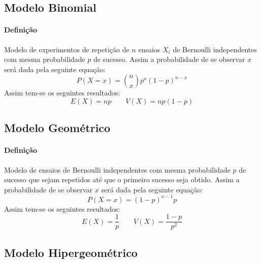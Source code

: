 \documentclass{article}
\begin{document}
        \subsection{Modelo Binomial}
            \paragraph{Definição}Modelo de experimentos de repetição de $n$ ensaios $X_{i}$ de Bernoulli independentes com mesma probabilidade $p$ de sucesso. Assim a probabilidade de se observar $x$ será dada pela seguinte equação:
                \begin{equation}
                    \boxed{
                        P(X = x) = \binom{n}{x} p^{x}(1-p)^{n-x}
                    }
                \end{equation}
            Assim tem-se os seguintes resultados:
                \begin{equation}
                    \boxed{
                        E(X) = np
                    }
                    \qquad
                    \boxed{
                        V(X) = np(1-p)
                    }
                \end{equation}

        \subsection{Modelo Geométrico}
            \paragraph{Definição}Modelo de ensaios de Bernoulli independentes com mesma probabilidade $p$ de sucesso que sejam repetidos até que o primeiro sucesso seja obtido. Assim a probabilidade de se observar $x$ será dada pela seguinte equação:
                \begin{equation}
                    \boxed{
                        P(X = x) = (1-p)^{x-1}p
                    }
                \end{equation}
            Assim tem-se os seguintes resultados:
                \begin{equation}
                    \boxed{
                        E(X) = \frac{1}{p}
                    }
                    \qquad
                    \boxed{
                        V(X) = \frac{1-p}{p^{2}}
                    }
                \end{equation}

        \subsection{Modelo Hipergeométrico}
\end{document}
